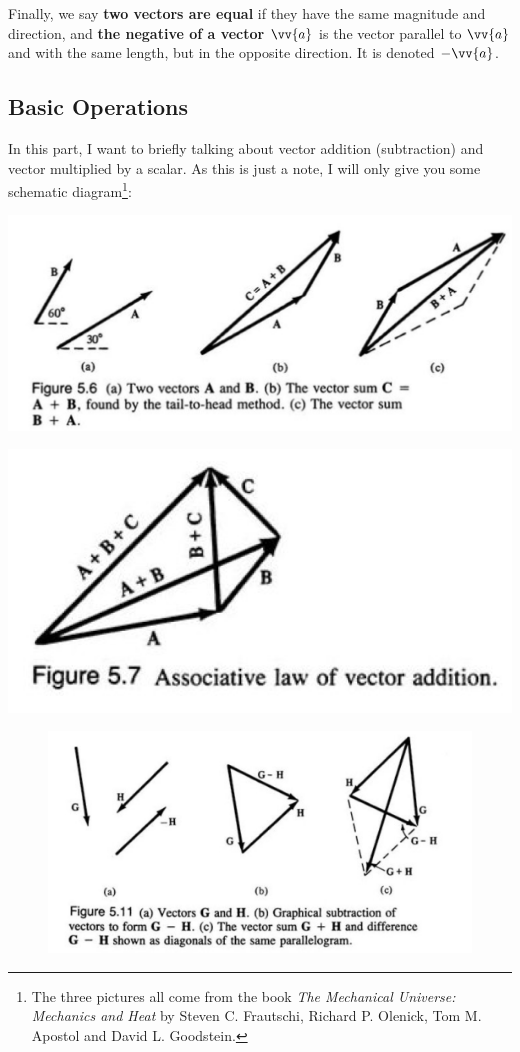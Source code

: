 \documentclass[12pt, a4paper, reqno]{amsart}
\theoremstyle{definition}
\numberwithin{equation}{section} %
\begin{document}
Finally, we say \textbf{two vectors are equal} if they have the same magnitude and direction, and \textbf{the negative of a vector $\vv{a}$} is the vector parallel to $\vv{a}$ and with the same length, but in the opposite direction. It is denoted $-\vv{a}$.


\subsection{Basic Operations}\label{SS:BO}\hfill

In this part, I want to briefly talking about vector addition (subtraction) and vector multiplied by a scalar. As this is just a note, I will only give you some schematic diagram\footnote{The three pictures all come from the book \textit{The Mechanical Universe: Mechanics and Heat} by Steven C. Frautschi, Richard P. Olenick, Tom M. Apostol and David L. Goodstein.}\label{f:VAS}:

\begin{minipage}{.5\textwidth}
	\centering
	\includegraphics[width=.9\linewidth]{1.png}
	\label{F:ADD}
\end{minipage}%
\begin{minipage}{.5\textwidth}
	\centering
	\includegraphics[width=.9\linewidth]{2.png}
\end{minipage}
\begin{figure}[h]
	\centering\includegraphics[width=.4\linewidth]{3.png}
	\caption{}
	\label{fig:VAS}
\end{figure}
\end{document}
